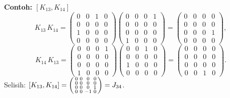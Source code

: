\noindent \textbf{Contoh: $[K_{13}, K_{14}]$}
\begin{equation}
    K_{13}\,K_{14} = \begin{pmatrix}0&0&1&0\\0&0&0&0\\1&0&0&0\\0&0&0&0\end{pmatrix}\!\begin{pmatrix}0&0&0&1\\0&0&0&0\\0&0&0&0\\1&0&0&0\end{pmatrix}
    = \begin{pmatrix}0&0&0&0\\0&0&0&0\\0&0&0&1\\0&0&0&0\end{pmatrix},
\end{equation}
\begin{equation}
    K_{14}\,K_{13} = \begin{pmatrix}0&0&0&1\\0&0&0&0\\0&0&0&0\\1&0&0&0\end{pmatrix}\!\begin{pmatrix}0&0&1&0\\0&0&0&0\\1&0&0&0\\0&0&0&0\end{pmatrix}
    = \begin{pmatrix}0&0&0&0\\0&0&0&0\\0&0&0&0\\0&0&1&0\end{pmatrix}.
\end{equation}
Selisih: $[K_{13},K_{14}] = \begin{psmallmatrix}0&0&0&0\\0&0&0&0\\0&0&0&1\\0&0&-1&0\end{psmallmatrix} = J_{34}$.

